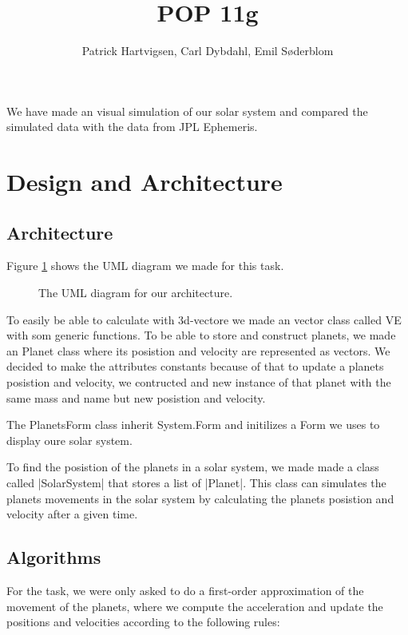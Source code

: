 \documentclass[a4paper]{article}
\title{POP 11g}
\author{Patrick Hartvigsen, Carl Dybdahl, Emil Søderblom}
\begin{document}
\maketitle

We have made an visual simulation of our solar system and compared the simulated data with the data from JPL Ephemeris.

\section{Design and Architecture}

\subsection{Architecture}

Figure \ref{uml} shows the UML diagram we made for this task. 

\begin{figure}[!ht]
\centering
\caption{The UML diagram for our architecture.}
\label{uml}
\end{figure}

To easily be able to calculate with 3d-vectore we made an vector class called VE with som generic functions.
To be able to store and construct planets, we made an Planet class where its posistion and velocity are represented as vectors. We decided to make the attributes constants because of that to update a planets posistion and velocity, we contructed and new instance of that planet with the same mass and name but new posistion and velocity.

The PlanetsForm class inherit System.Form and initilizes a Form we uses to display oure solar system.


To find the posistion of the planets in a solar system, we made made a class called \code|SolarSystem| that stores a list of \code|Planet|. This class can simulates the planets movements in the solar system by calculating the planets posistion and velocity after a given time.


\subsection{Algorithms}

For the task, we were only asked to do a first-order approximation of the movement of the planets, where we compute the acceleration and update the positions and velocities according to the following rules:
\end{document}
